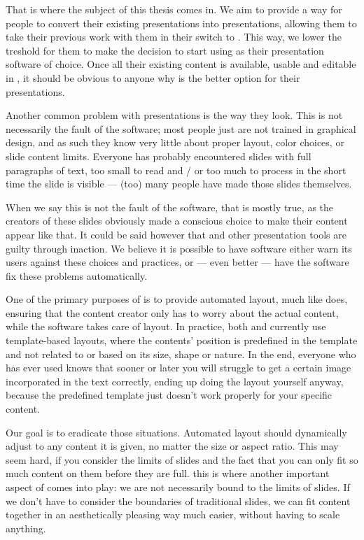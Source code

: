  That is where the subject of this thesis comes in. We aim to provide a way
  for people to convert their existing \ppt presentations into \mxp
  presentations, allowing them to take their previous work with them in their
  switch to \mxp. This way, we lower the treshold for them to make the decision
  to start using \mxp as their presentation software of choice. Once all their
  existing \ppt content is available, usable and editable in \mxp, it should be
  obvious to anyone why \mxp is the better option for their presentations.


  Another common problem with \ppt presentations is the way they look. This is
  not necessarily the fault of the software; most people just are not trained
  in graphical design, and as such they know very little about proper layout,
  color choices, or slide content limits. Everyone has probably encountered
  slides with full paragraphs of text, too small to read and / or too much to
  process in the short time the slide is visible --- (too) many people have
  made those slides themselves.

  When we say this is not the fault of the software, that is mostly true, as
  the creators of these slides obviously made a conscious choice to make their
  content appear like that. It could be said however that \ppt* and other
  presentation tools are guilty through inaction. We believe it is possible to
  have software either warn its users against these choices and practices, or
  --- even better --- have the software fix these problems automatically.

  One of the primary purposes of \mxp is to provide automated layout, much like
  \latex does, ensuring that the content creator only has to worry about the
  actual content, while the software takes care of layout. In practice, both
  \latex and \mxp currently use template-based layouts, where the contents'
  position is predefined in the template and not related to or based on its
  size, shape or nature. In the end, everyone who has ever used \latex knows
  that sooner or later you will struggle to get a certain image incorporated in
  the text correctly, ending up doing the layout yourself anyway, because the
  predefined template just doesn't work properly for your specific content.

  Our goal is to eradicate those situations. Automated layout should
  dynamically adjust to any content it is given, no matter the size or aspect
  ratio. This may seem hard, if you consider the limits of slides and the fact
  that you can only fit so much content on them before they are full. this is
  where another important aspect of \mxp comes into play: we are not
  necessarily bound to the limits of slides. If we don't have to consider the
  boundaries of traditional slides, we can fit content together in an
  aesthetically pleasing way much easier, without having to scale anything.


